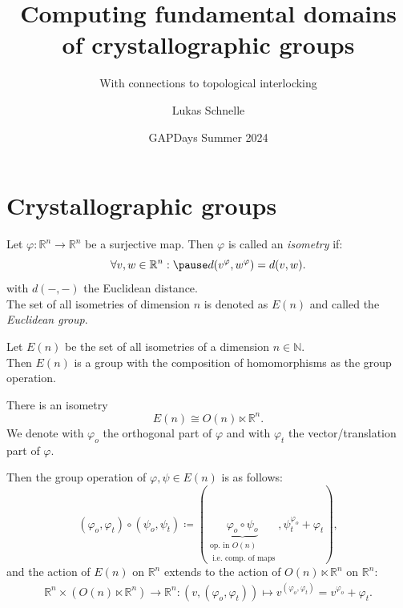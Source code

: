 \documentclass{beamer}
\title{Computing fundamental domains of crystallographic groups}
\subtitle{With connections to topological interlocking}
\author{Lukas Schnelle}
\date{GAPDays Summer 2024}
\theoremstyle{plain}
\newcommand\R{\mathbb R}
\newcommand\N{\mathbb N}
\renewcommand{\phi}{\varphi}
\begin{document}
\frame[plain]{\titlepage}

\section{Crystallographic groups}

\begin{frame}
    \begin{definition}\label{def:isometry}
        Let $\phi:\R^n \to \R^n$ be a surjective map. 
        Then $\phi$ is called an \emph{isometry} if: \pause
        $$
            \forall v, w \in \R^n : \pause d(v^\phi, w^\phi) = d(v,w).
        $$
        with $d(-,-)$ the Euclidean distance.\\ \pause 
        The set of all isometries of dimension $n$ is denoted as $E(n)$ and called the \emph{Euclidean group}.
    \end{definition}

    \begin{lemma}\label{lma:isom-is-grp}
        Let $E(n)$ be the set of all isometries of a dimension $n \in \N$. \\ \pause
        Then $E(n)$ is a group with the composition of homomorphisms as the group operation.
    \end{lemma}
\end{frame}

\begin{frame}
    \begin{proposition}
        There is an isometry
        $$
            E(n) \cong O(n) \ltimes \R^n.
        $$
        We denote with $\phi_o$ the orthogonal part of $\phi$ and with $\phi_t$ the vector/translation part of $\phi$.
    \end{proposition}

    Then the group operation of $\phi, \psi \in E(n)$ is as follows:\pause
    $$
        (\phi_o, \phi_t) \circ (\psi_o, \psi_t) \coloneqq (\underbrace{\phi_o \circ \psi_o}_{\substack{\text{op. in }O(n)\\ \text{ i.e. comp. of maps}}}, \psi_t^{\phi_o} + \phi_t),
    $$\pause
    and the action of $E(n)$ on $\R^n$ extends to the action of $O(n) \ltimes \R^n$ on $\R^n$:\pause
    \begin{align*} \label{align:semidirect-action}
        \R^n \times ( O(n) \ltimes \R^n) \to \R^n: (v, (\phi_o, \phi_t)) \mapsto v^{(\phi_o, \phi_t)} = v^{\phi_o} + \phi_t.
    \end{align*}
\end{frame}
\end{document}
